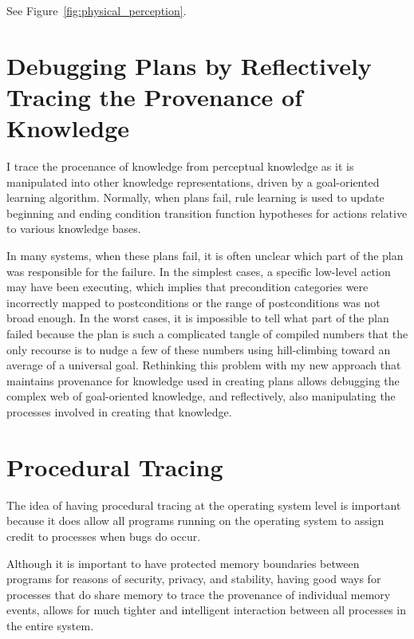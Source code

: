 See Figure~\ref{fig:physical_perception}.


\section{Debugging Plans by Reflectively Tracing the Provenance of Knowledge}

I trace the procenance of knowledge from perceptual knowledge as it
is manipulated into other knowledge representations, driven by a
goal-oriented learning algorithm.  Normally, when plans fail, rule
learning is used to update beginning and ending condition transition
function hypotheses for actions relative to various knowledge bases.

In many systems, when these plans fail, it is often unclear which part
of the plan was responsible for the failure.  In the simplest cases, a
specific low-level action may have been executing, which implies that
precondition categories were incorrectly mapped to postconditions or
the range of postconditions was not broad enough.  In the worst cases,
it is impossible to tell what part of the plan failed because the plan
is such a complicated tangle of compiled numbers that the only
recourse is to nudge a few of these numbers using hill-climbing toward
an average of a universal goal.  Rethinking this problem with my new
approach that maintains provenance for knowledge used in creating
plans allows debugging the complex web of goal-oriented knowledge, and
reflectively, also manipulating the processes involved in creating
that knowledge.

\section{Procedural Tracing}

The idea of having procedural tracing at the operating system level is
important because it does allow all programs running on the operating
system to assign credit to processes when bugs do occur.


Although it is important to have protected memory boundaries between
programs for reasons of security, privacy, and stability, having good
ways for processes that do share memory to trace the provenance of
individual memory events, allows for much tighter and intelligent
interaction between all processes in the entire system.
        


